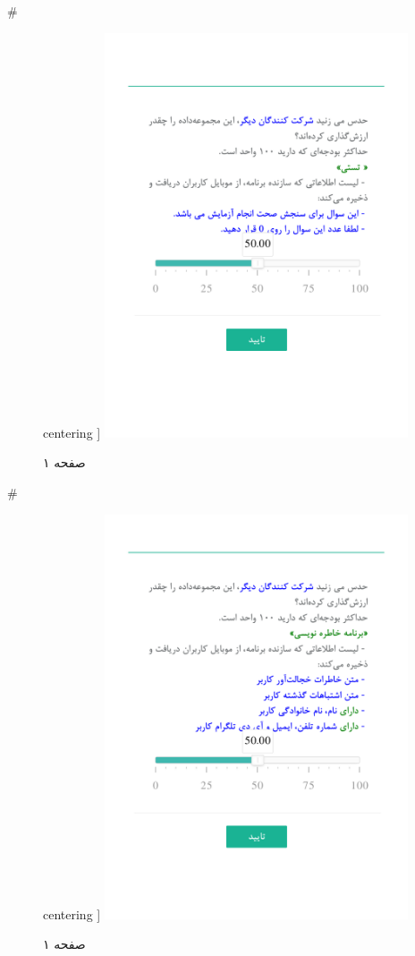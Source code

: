 { 
 # 
\begin{figure}[htpb]
centering ]
\includegraphics[width=0.8\textwidth]{./img/Task63.png/}
\caption{صفحه ۱}
\label{fig:Task1}
\end{figure}
 
 
 # 
\begin{figure}[htpb]
centering ]
\includegraphics[width=0.8\textwidth]{./img/Task64.png/}
\caption{صفحه ۱}
\label{fig:Task1}
\end{figure}
 
}
